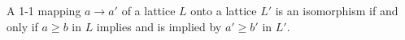 A 1-1 mapping $a \rightarrow a'$ of a lattice $L$ onto a lattice $L'$ is an isomorphism if and only if $a \geq b$ in $L$ implies and is implied by $a' \geq b'$ in $L'$.
